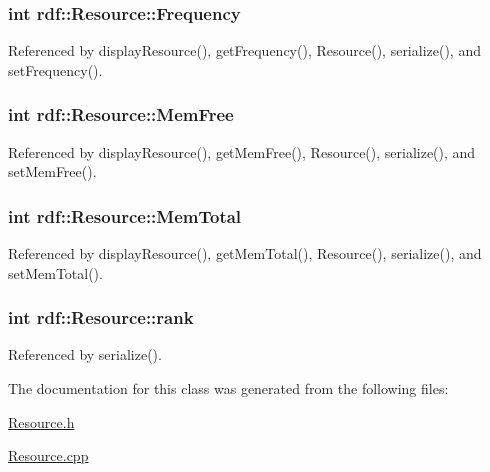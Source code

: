 \subsubsection[{\texorpdfstring{Frequency}{Frequency}}]{\setlength{\rightskip}{0pt plus 5cm}int rdf\+::\+Resource\+::\+Frequency\hspace{0.3cm}{\ttfamily [private]}}\hypertarget{classrdf_1_1Resource_ab5f7c94360292b32006f95e4a718decb}{}\label{classrdf_1_1Resource_ab5f7c94360292b32006f95e4a718decb}


Referenced by display\+Resource(), get\+Frequency(), Resource(), serialize(), and set\+Frequency().

\subsubsection[{\texorpdfstring{Mem\+Free}{MemFree}}]{\setlength{\rightskip}{0pt plus 5cm}int rdf\+::\+Resource\+::\+Mem\+Free\hspace{0.3cm}{\ttfamily [private]}}\hypertarget{classrdf_1_1Resource_a6fa4758d8e1cbc6315073e204bfcae7a}{}\label{classrdf_1_1Resource_a6fa4758d8e1cbc6315073e204bfcae7a}


Referenced by display\+Resource(), get\+Mem\+Free(), Resource(), serialize(), and set\+Mem\+Free().

\subsubsection[{\texorpdfstring{Mem\+Total}{MemTotal}}]{\setlength{\rightskip}{0pt plus 5cm}int rdf\+::\+Resource\+::\+Mem\+Total\hspace{0.3cm}{\ttfamily [private]}}\hypertarget{classrdf_1_1Resource_a37ff1f3b7071c2cdd5dcfa39ed0c7174}{}\label{classrdf_1_1Resource_a37ff1f3b7071c2cdd5dcfa39ed0c7174}


Referenced by display\+Resource(), get\+Mem\+Total(), Resource(), serialize(), and set\+Mem\+Total().

\subsubsection[{\texorpdfstring{rank}{rank}}]{\setlength{\rightskip}{0pt plus 5cm}int rdf\+::\+Resource\+::rank\hspace{0.3cm}{\ttfamily [private]}}\hypertarget{classrdf_1_1Resource_abbff4961e68af1fe21b676b5d6d82146}{}\label{classrdf_1_1Resource_abbff4961e68af1fe21b676b5d6d82146}


Referenced by serialize().



The documentation for this class was generated from the following files\+:\begin{DoxyCompactItemize}
\item 
\hyperlink{Resource_8h}{Resource.\+h}\item 
\hyperlink{Resource_8cpp}{Resource.\+cpp}\end{DoxyCompactItemize}
